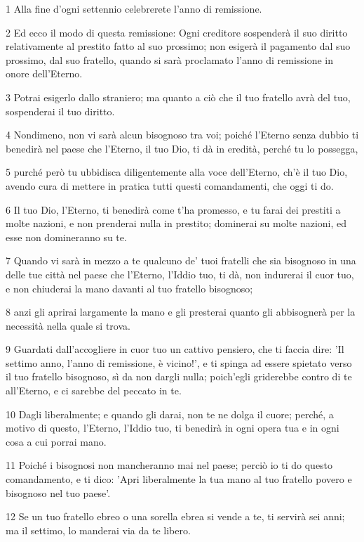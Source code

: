 \par 1 Alla fine d'ogni settennio celebrerete l'anno di remissione.
\par 2 Ed ecco il modo di questa remissione: Ogni creditore sospenderà il suo diritto relativamente al prestito fatto al suo prossimo; non esigerà il pagamento dal suo prossimo, dal suo fratello, quando si sarà proclamato l'anno di remissione in onore dell'Eterno.
\par 3 Potrai esigerlo dallo straniero; ma quanto a ciò che il tuo fratello avrà del tuo, sospenderai il tuo diritto.
\par 4 Nondimeno, non vi sarà alcun bisognoso tra voi; poiché l'Eterno senza dubbio ti benedirà nel paese che l'Eterno, il tuo Dio, ti dà in eredità, perché tu lo possegga,
\par 5 purché però tu ubbidisca diligentemente alla voce dell'Eterno, ch'è il tuo Dio, avendo cura di mettere in pratica tutti questi comandamenti, che oggi ti do.
\par 6 Il tuo Dio, l'Eterno, ti benedirà come t'ha promesso, e tu farai dei prestiti a molte nazioni, e non prenderai nulla in prestito; dominerai su molte nazioni, ed esse non domineranno su te.
\par 7 Quando vi sarà in mezzo a te qualcuno de' tuoi fratelli che sia bisognoso in una delle tue città nel paese che l'Eterno, l'Iddio tuo, ti dà, non indurerai il cuor tuo, e non chiuderai la mano davanti al tuo fratello bisognoso;
\par 8 anzi gli aprirai largamente la mano e gli presterai quanto gli abbisognerà per la necessità nella quale si trova.
\par 9 Guardati dall'accogliere in cuor tuo un cattivo pensiero, che ti faccia dire: 'Il settimo anno, l'anno di remissione, è vicino!', e ti spinga ad essere spietato verso il tuo fratello bisognoso, sì da non dargli nulla; poich'egli griderebbe contro di te all'Eterno, e ci sarebbe del peccato in te.
\par 10 Dagli liberalmente; e quando gli darai, non te ne dolga il cuore; perché, a motivo di questo, l'Eterno, l'Iddio tuo, ti benedirà in ogni opera tua e in ogni cosa a cui porrai mano.
\par 11 Poiché i bisognosi non mancheranno mai nel paese; perciò io ti do questo comandamento, e ti dico: 'Apri liberalmente la tua mano al tuo fratello povero e bisognoso nel tuo paese'.
\par 12 Se un tuo fratello ebreo o una sorella ebrea si vende a te, ti servirà sei anni; ma il settimo, lo manderai via da te libero.
